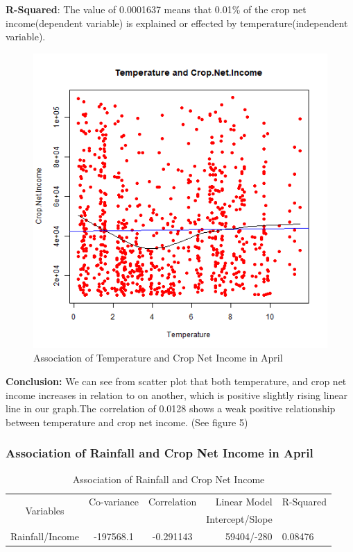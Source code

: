 \documentclass[12pt, a4paper]{article}
\begin{document}
\justify
\textbf{R-Squared}: 
The value of 0.0001637 means that 0.01\% of the crop net income(dependent variable) is explained or effected by temperature(independent variable).

\begin{figure}[H]
\centering
\includegraphics[trim={0 0 0 0}, scale=0.7, clip]{temperature_Income.png}
\caption{Association of Temperature and Crop Net Income in April}
\end{figure}

\justify
\textbf{Conclusion:} We can see from scatter plot   that  both temperature, and crop net income increases in relation to on another, which is  positive slightly rising linear line in our graph.The correlation of 0.0128 shows a weak positive relationship between temperature and crop net income.  (See figure 5)  \\
\newpage
\subsubsection{Association of Rainfall and Crop Net Income in April}

\begin{table}[h]
\begin{center}
\caption {Association of Rainfall and Crop Net Income}
\begin{tabular}{|c|c|c|r|l|}
	\hline
     \multirow{2}{*}{Variables} & Co-variance & Correlation & 
     Linear Model & R-Squared \\ & & & Intercept/Slope & \\
     \hline
     \hline
     Rainfall/Income  & -197568.1 & -0.291143 & 59404/-280 & 0.08476 \\
     \hline

\end{tabular}
\end{center}
\end{table}
\end{document}
